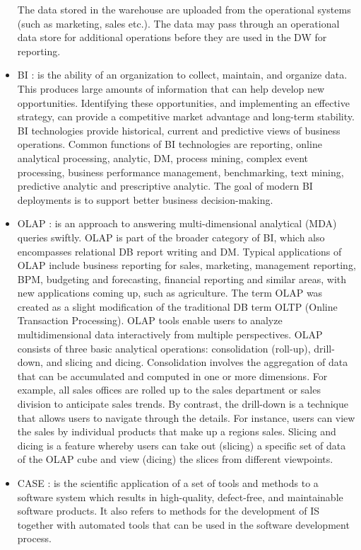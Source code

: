 \documentclass[12pt,a4paper,final,twoside,onecolumn,titlepage]{book}
\begin{document}
\begin{itemize}
The data stored in the warehouse are uploaded from the operational systems (such as marketing, sales etc.). The data may pass through an operational data store for additional operations before they are used in the DW for reporting.
\item \gls{BI} \cite{Wiki-BI}: is the ability of an organization to collect, maintain, and organize data. This produces large amounts of information that can help develop new opportunities. Identifying these opportunities, and implementing an effective strategy, can provide a competitive market advantage and long-term stability. BI technologies provide historical, current and predictive views of business operations. Common functions of \gls{BI} technologies are reporting, online analytical processing, analytic, \gls{DM}, process mining, complex event processing, business performance management, benchmarking, text mining, predictive analytic and prescriptive analytic.
The goal of modern \gls{BI} deployments is to support better business decision-making.
\item \gls{OLAP} \cite{Wiki-OLAP}: is an approach to answering multi-dimensional analytical (MDA) queries swiftly. \gls{OLAP} is part of the broader category of \gls{BI}, which also encompasses relational \gls{DB} report writing and \gls{DM}. Typical applications of \gls{OLAP} include business reporting for sales, marketing, management reporting, \gls{BPM}, budgeting and forecasting, financial reporting and similar areas, with new applications coming up, such as agriculture. The term \gls{OLAP} was created as a slight modification of the traditional \gls{DB} term OLTP (Online Transaction Processing). \gls{OLAP} tools enable users to analyze multidimensional data interactively from multiple perspectives. \gls{OLAP} consists of three basic analytical operations: consolidation (roll-up), drill-down, and slicing and dicing. Consolidation involves the aggregation of data that can be accumulated and computed in one or more dimensions. For example, all sales offices are rolled up to the sales department or sales division to anticipate sales trends. By contrast, the drill-down is a technique that allows users to navigate through the details. For instance, users can view the sales by individual products that make up a regions sales. Slicing and dicing is a feature whereby users can take out (slicing) a specific set of data of the \gls{OLAP} cube and view (dicing) the slices from different viewpoints.
\item \gls{CASE} \cite{Wiki-CASE}: is the scientific application of a set of tools and methods to a software system which results in high-quality, defect-free, and maintainable software products. It also refers to methods for the development of \gls{IS} together with automated tools that can be used in the software development process.

\end{itemize}
\end{document}
